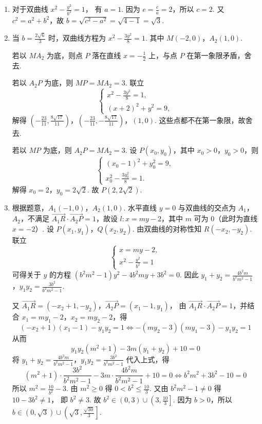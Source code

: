 \begin{solution}
\begin{enumerate}
\item 对于双曲线
\(x^2-\frac{y^2}{b^2}=1\)，
有 \(a=1\). 因为 \(e=\frac{c}{a}=2\)，所以 \(c=2\). 又 \(c^2=a^2+b^2\)，故
\(b=\sqrt{c^2-a^2}=\sqrt{4-1}=\sqrt{3}\).

\item 当 \(b=\frac{2\sqrt{6}}{3}\) 时，双曲线方程为
\(x^2-\frac{3y^2}{8}=1\).
其中 \(M(-2,0)\)，\(A_2(1,0)\).

若以 \(MA_2\) 为底，则点 \(P\) 落在直线 \(x=-\frac{1}{2}\) 上，与点 \(P\) 在第一象限矛盾，舍去.

若以 \(A_2P\) 为底，则 \(MP=MA_2=3\). 联立
\[
\begin{cases}
x^2-\frac{3y^2}{8}=1,\\
(x+2)^2+y^2=9,
\end{cases}
\]
解得
\(\left( -\frac{23}{11},\frac{8\sqrt{17}}{11} \right)\)，\(\left(-\frac{23}{11},-\frac{8\sqrt{17}}{11}\right)\)，\((1,0)\).
这些点都不在第一象限，故舍去.

若以 \(MP\) 为底，则 \(A_2P=MA_2=3\). 设 \(P(x_0,y_0)\)，其中 \(x_0>0\)，\(y_0>0\)，则
\[
\begin{cases}
(x_0-1)^2+y_0^2=9,\\
x_0^2-\frac{3y_0^2}{8}=1.
\end{cases}
\]
解得
\(x_0=2\)，\(y_0=2\sqrt{2}\).
故
\(P(2,2\sqrt{2})\).

\item 根据题意，\(A_1(-1,0)\)，\(A_2(1,0)\). 水平直线 \(y=0\) 与双曲线的交点为 \(A_1\)，\(A_2\)，不满足 \(\overrightarrow{A_1R}\cdot\overrightarrow{A_2P}=1\)，故设
\(l:x=my-2\)，其中 \(m\) 可为 \(0\)（此时为直线 \(x=-2\)）.
设
\(P(x_1,y_1)\)，\(Q(x_2,y_2)\).
由双曲线的对称性知
\(R(-x_2,-y_2)\).
联立
\[
\begin{cases}
x=my-2,\\
x^2-\frac{y^2}{b^2}=1
\end{cases}
\]
可得关于 \(y\) 的方程
\((b^2m^2-1)y^2-4b^2my+3b^2=0\).
因此
\(y_1+y_2=\frac{4b^2m}{b^2m^2-1}\)，\(y_1y_2=\frac{3b^2}{b^2m^2-1}\).


又
\(\overrightarrow{A_1R}=(-x_2+1,-y_2)\)，\(\overrightarrow{A_2P}=(x_1-1,y_1)\)，
由 \(\overrightarrow{A_1R}\cdot\overrightarrow{A_2P}=1\)，并结合 \(x_1=my_1-2\)，\(x_2=my_2-2\)，得
\[
(-x_2+1)(x_1-1)-y_1y_2=1
\iff -(my_2-3)(my_1-3)-y_1y_2=1
\]
从而
\[
y_1y_2(m^2+1)-3m(y_1+y_2)+10=0
\]
将 \(y_1+y_2=\frac{4b^2m}{b^2m^2-1}\)，\(y_1y_2=\frac{3b^2}{b^2m^2-1}\) 代入上式，得
\[
(m^2+1)\cdot \frac{3b^2}{b^2m^2-1}-3m\cdot \frac{4b^2m}{b^2m^2-1}+10=0
\iff b^2m^2+3b^2-10=0
\]
所以
\(m^2=\frac{10}{b^2}-3\).
由 \(m^2\ge 0\) 得
\(0<b^2\le\frac{10}{3}\).
又由 \(b^2m^2-1\ne 0\) 得
\(10-3b^2\ne 1\)，
即
\(b^2\ne 3\).
故
\(b^2\in \left( 0,3 \right)\cup \left( 3,\frac{10}{3} \right]\).
因为 \(b>0\)，所以
\(b\in (0,\sqrt{3})\cup \left( \sqrt{3},\frac{\sqrt{30}}{3} \right]\).
\end{enumerate}
\end{solution}

